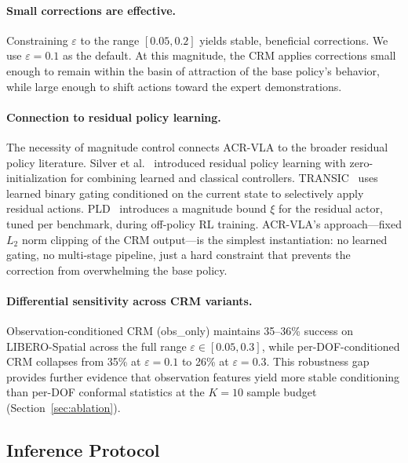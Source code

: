 \paragraph{Small corrections are effective.}
Constraining $\varepsilon$ to the range $[0.05, 0.2]$ yields stable, beneficial corrections. We use $\varepsilon = 0.1$ as the default. At this magnitude, the CRM applies corrections small enough to remain within the basin of attraction of the base policy's behavior, while large enough to shift actions toward the expert demonstrations.

\paragraph{Connection to residual policy learning.}
The necessity of magnitude control connects ACR-VLA to the broader residual policy literature. Silver et al.~\cite{silver2018residual} introduced residual policy learning with zero-initialization for combining learned and classical controllers. TRANSIC~\cite{jiang2024transic} uses learned binary gating conditioned on the current state to selectively apply residual actions. PLD~\cite{xiao2026pld} introduces a magnitude bound $\xi$ for the residual actor, tuned per benchmark, during off-policy RL training. ACR-VLA's approach---fixed $L_2$ norm clipping of the CRM output---is the simplest instantiation: no learned gating, no multi-stage pipeline, just a hard constraint that prevents the correction from overwhelming the base policy.

\paragraph{Differential sensitivity across CRM variants.}
Observation-conditioned CRM (obs\_only) maintains 35--36\% success on LIBERO-Spatial across the full range $\varepsilon \in [0.05, 0.3]$, while per-DOF-conditioned CRM collapses from 35\% at $\varepsilon = 0.1$ to 26\% at $\varepsilon = 0.3$. This robustness gap provides further evidence that observation features yield more stable conditioning than per-DOF conformal statistics at the $K{=}10$ sample budget (Section~\ref{sec:ablation}).

\subsection{Inference Protocol}
\label{sec:inference_protocol}


